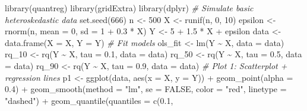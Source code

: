\documentclass[fleqn,8pt]{latex/stylish_article} %
\newenvironment{Shaded}{\begin{snugshade}}{\end{snugshade}}
\newcommand{\DecValTok}[1]{\textcolor[rgb]{0.00,0.00,0.81}{{#1}}}
\newcommand{\FloatTok}[1]{\textcolor[rgb]{0.00,0.00,0.81}{{#1}}}
\newcommand{\ConstantTok}[1]{\textcolor[rgb]{0.00,0.00,0.00}{{#1}}}
\newcommand{\SpecialCharTok}[1]{\textcolor[rgb]{0.00,0.00,0.00}{{#1}}}
\newcommand{\StringTok}[1]{\textcolor[rgb]{0.31,0.60,0.02}{{#1}}}
\newcommand{\CommentTok}[1]{\textcolor[rgb]{0.56,0.35,0.01}{\textit{{#1}}}}
\newcommand{\OtherTok}[1]{\textcolor[rgb]{0.56,0.35,0.01}{{#1}}}
\newcommand{\FunctionTok}[1]{\textcolor[rgb]{0.00,0.00,0.00}{{#1}}}
\newcommand{\AttributeTok}[1]{\textcolor[rgb]{0.77,0.63,0.00}{{#1}}}
\newcommand{\NormalTok}[1]{{#1}}
\begin{document}
\begin{Shaded}
\begin{Highlighting}[]
\FunctionTok{library}\NormalTok{(quantreg)}
\FunctionTok{library}\NormalTok{(gridExtra)}
\FunctionTok{library}\NormalTok{(dplyr)}
\CommentTok{\# Simulate basic heteroskedastic data}
\FunctionTok{set.seed}\NormalTok{(}\DecValTok{666}\NormalTok{)}
\NormalTok{n }\OtherTok{\textless{}{-}} \DecValTok{500}
\NormalTok{X }\OtherTok{\textless{}{-}} \FunctionTok{runif}\NormalTok{(n, }\DecValTok{0}\NormalTok{, }\DecValTok{10}\NormalTok{)}
\NormalTok{epsilon }\OtherTok{\textless{}{-}} \FunctionTok{rnorm}\NormalTok{(n, }\AttributeTok{mean =} \DecValTok{0}\NormalTok{, }\AttributeTok{sd =} \DecValTok{1} \SpecialCharTok{+} \FloatTok{0.3} \SpecialCharTok{*}\NormalTok{ X)}
\NormalTok{Y }\OtherTok{\textless{}{-}} \DecValTok{5} \SpecialCharTok{+} \FloatTok{1.5} \SpecialCharTok{*}\NormalTok{ X }\SpecialCharTok{+}\NormalTok{ epsilon}
\NormalTok{data }\OtherTok{\textless{}{-}} \FunctionTok{data.frame}\NormalTok{(}\AttributeTok{X =}\NormalTok{ X, }\AttributeTok{Y =}\NormalTok{ Y)}
\CommentTok{\# Fit models}
\NormalTok{ols\_fit }\OtherTok{\textless{}{-}} \FunctionTok{lm}\NormalTok{(Y }\SpecialCharTok{\textasciitilde{}}\NormalTok{ X, }\AttributeTok{data =}\NormalTok{ data)}
\NormalTok{rq\_10 }\OtherTok{\textless{}{-}} \FunctionTok{rq}\NormalTok{(Y }\SpecialCharTok{\textasciitilde{}}\NormalTok{ X, }\AttributeTok{tau =} \FloatTok{0.1}\NormalTok{, }\AttributeTok{data =}\NormalTok{ data)}
\NormalTok{rq\_50 }\OtherTok{\textless{}{-}} \FunctionTok{rq}\NormalTok{(Y }\SpecialCharTok{\textasciitilde{}}\NormalTok{ X, }\AttributeTok{tau =} \FloatTok{0.5}\NormalTok{, }\AttributeTok{data =}\NormalTok{ data)}
\NormalTok{rq\_90 }\OtherTok{\textless{}{-}} \FunctionTok{rq}\NormalTok{(Y }\SpecialCharTok{\textasciitilde{}}\NormalTok{ X, }\AttributeTok{tau =} \FloatTok{0.9}\NormalTok{, }\AttributeTok{data =}\NormalTok{ data)}
\CommentTok{\# Plot 1: Scatterplot + regression lines}
\NormalTok{p1 }\OtherTok{\textless{}{-}} \FunctionTok{ggplot}\NormalTok{(data, }\FunctionTok{aes}\NormalTok{(}\AttributeTok{x =}\NormalTok{ X, }\AttributeTok{y =}\NormalTok{ Y)) }\SpecialCharTok{+} \FunctionTok{geom\_point}\NormalTok{(}\AttributeTok{alpha =} \FloatTok{0.4}\NormalTok{) }\SpecialCharTok{+}
    \FunctionTok{geom\_smooth}\NormalTok{(}\AttributeTok{method =} \StringTok{"lm"}\NormalTok{, }\AttributeTok{se =} \ConstantTok{FALSE}\NormalTok{, }\AttributeTok{color =} \StringTok{"red"}\NormalTok{,}
        \AttributeTok{linetype =} \StringTok{"dashed"}\NormalTok{) }\SpecialCharTok{+} \FunctionTok{geom\_quantile}\NormalTok{(}\AttributeTok{quantiles =} \FunctionTok{c}\NormalTok{(}\FloatTok{0.1}\NormalTok{,}

\end{Highlighting}
\end{Shaded}
\end{document}
